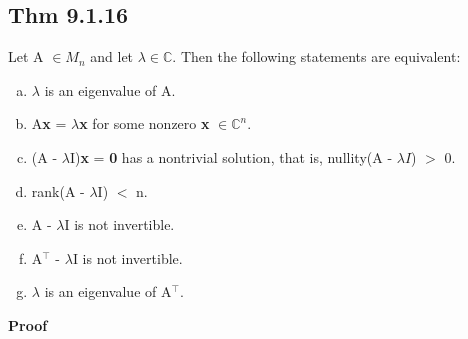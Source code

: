 \documentclass[12pt, letterpaper]{article}
\begin{document}
\subsection{Thm 9.1.16}
Let A $\in M_n$ and let $\lambda \in \mathbb{C}$. Then the following statements are equivalent:
\begin{enumerate}[(a)]
    \item $\lambda$ is an eigenvalue of A.
    \item A\textbf{x} = $\lambda$\textbf{x} for some nonzero \textbf{x} $\in \mathbb{C}^n$.
    \item (A - $\lambda$I)\textbf{x} = \textbf{0} has a nontrivial solution, that is, nullity(A - $\lambda I$) $>$ 0.
    \item rank(A - $\lambda$I) $<$ n.
    \item A - $\lambda$I is not invertible.
    \item A$^\top$ - $\lambda$I is not invertible.
    \item $\lambda$ is an eigenvalue of A$^\top$.
\end{enumerate}
\textbf{Proof}
\end{document}
